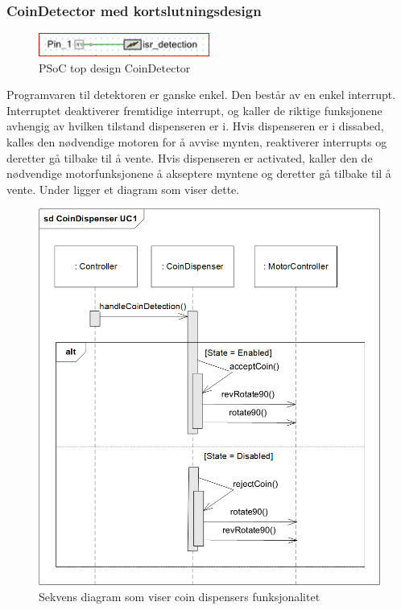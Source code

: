 \documentclass[Softwaredesign/Softwaredesign_main.tex]{subfiles}
\begin{document}
\subsubsection{CoinDetector med kortslutningsdesign} 
\begin{figure}[H]
    \centering
    \includegraphics[width=0.5\textwidth]{Softwaredesign/CoinSensor/graphics/TopDesign-CoinDetector.png}
    \caption{PSoC top design CoinDetector}
    \label{fig:CoinDetector_PSoC_Design}
    \end{figure}
Programvaren til detektoren er ganske enkel. Den består av en enkel interrupt. Interruptet deaktiverer fremtidige interrupt, og kaller de riktige funksjonene avhengig av hvilken tilstand dispenseren er i. Hvis dispenseren er i dissabed, kalles den nødvendige motoren for å avvise mynten, reaktiverer interrupts og deretter gå tilbake til å vente. Hvis dispenseren er activated, kaller den de nødvendige motorfunksjonene å akseptere myntene og deretter gå tilbake til å vente. Under ligger et diagram som viser dette.
\begin{figure}[H]
    \centering
    \includegraphics[width=\textwidth]{Softwaredesign/CoinSensor/graphics/sd_CoinDispenser.png}
    \caption{Sekvens diagram som viser coin dispensers funksjonalitet}
    \label{fig:SDCoinDispAPP}
\end{figure}
\end{document}
